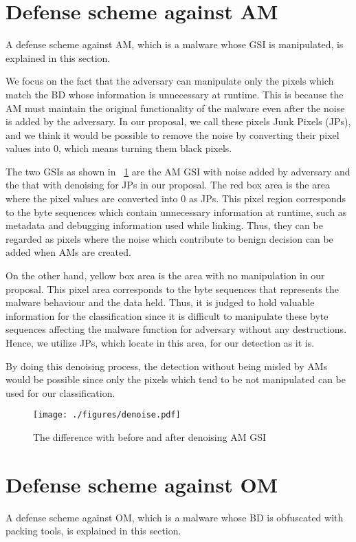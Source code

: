 \section{Defense scheme against AM}
A defense scheme against AM, which is a malware whose GSI is manipulated, is explained in this section.

We focus on the fact that the adversary can manipulate only the pixels which match the BD whose information is unnecessary at runtime.
This is because the AM must maintain the original functionality of the malware even after the noise is added by the adversary.
In our proposal, we call these pixels Junk Pixels (JPs), and we think it would be possible to remove the noise by converting their pixel values into 0, which means turning them black pixels.

The two GSIs as shown in \figurename~\ref{fig:denoise} are the AM GSI with noise added by adversary and the that with denoising for JPs in our proposal.
The red box area is the area where the pixel values are converted into 0 as JPs.
This pixel region corresponds to the byte sequences which contain unnecessary information at runtime, such as metadata and debugging information used while linking.
Thus, they can be regarded as pixels where the noise which contribute to benign decision can be added when AMs are created.

On the other hand, yellow box area is the area with no manipulation in our proposal.
This pixel area corresponds to the byte sequences that represents the malware behaviour and the data held.
Thus, it is judged to hold valuable information for the classification since it is difficult to manipulate these byte sequences affecting the malware function for adversary without any destructions.
Hence, we utilize JPs, which locate in this area, for our detection as it is.

By doing this denoising process, the detection without being misled by AMs would be possible since only the pixels which tend to be not manipulated can be used for our classification.

\begin{figure}[p]
 \centering
 \hspace{-55pt}
 \texttt{[image: ./figures/denoise.pdf]}
 \caption{The difference with before and after denoising AM GSI} 
 \label{fig:denoise}
\end{figure}
\afterpage{\clearpage}
\newpage
\section{Defense scheme against OM}
A defense scheme against OM, which is a malware whose BD is obfuscated with packing tools, is explained in this section.

